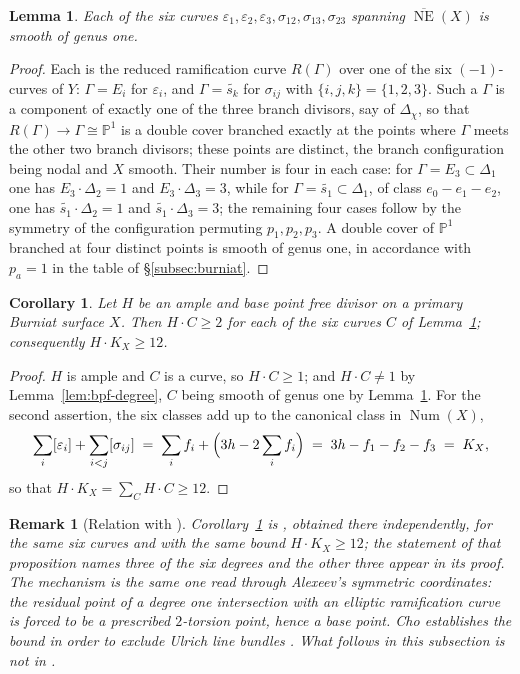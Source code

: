 \documentclass[10pt,a4paper]{amsart}
\newtheorem{lemma}[theorem]{Lemma}
\newtheorem{corollary}[theorem]{Corollary}
\newtheorem{remark}[theorem]{Remark}
\newcommand{\PP}{\mathbb{P}}
\newcommand{\Num}{\operatorname{Num}}
\newcommand{\NE}{\overline{\operatorname{NE}}}
\begin{document}
\begin{lemma}\label{lem:six-elliptic}
Each of the six curves $\varepsilon_1,\varepsilon_2,\varepsilon_3,\sigma_{12},\sigma_{13},\sigma_{23}$ spanning $\NE(X)$ is smooth of genus one.
\end{lemma}

\begin{proof}
Each is the reduced ramification curve $R(\Gamma)$ over one of the six $(-1)$-curves of $Y$: $\Gamma=E_i$ for $\varepsilon_i$, and $\Gamma=\widetilde{s_k}$ for $\sigma_{ij}$ with $\{i,j,k\}=\{1,2,3\}$. Such a $\Gamma$ is a component of exactly one of the three branch divisors, say of $\Delta_\chi$, so that $R(\Gamma)\to\Gamma\cong\PP^1$ is a double cover branched exactly at the points where $\Gamma$ meets the other two branch divisors; these points are distinct, the branch configuration being nodal and $X$ smooth. Their number is four in each case: for $\Gamma=E_3\subset\Delta_1$ one has $E_3\cdot\Delta_2=1$ and $E_3\cdot\Delta_3=3$, while for $\Gamma=\widetilde{s_1}\subset\Delta_1$, of class $e_0-e_1-e_2$, one has $\widetilde{s_1}\cdot\Delta_2=1$ and $\widetilde{s_1}\cdot\Delta_3=3$; the remaining four cases follow by the symmetry of the configuration permuting $p_1,p_2,p_3$. A double cover of $\PP^1$ branched at four distinct points is smooth of genus one, in accordance with $p_a=1$ in the table of \S\ref{subsec:burniat}.
\end{proof}

\begin{corollary}\label{cor:degreetwo}
Let $H$ be an ample and base point free divisor on a primary Burniat surface $X$. Then $H\cdot C\ge2$ for each of the six curves $C$ of Lemma~\ref{lem:six-elliptic}; consequently $H\cdot K_X\ge12$.
\end{corollary}

\begin{proof}
$H$ is ample and $C$ is a curve, so $H\cdot C\ge1$; and $H\cdot C\neq1$ by Lemma~\ref{lem:bpf-degree}, $C$ being smooth of genus one by Lemma~\ref{lem:six-elliptic}. For the second assertion, the six classes add up to the canonical class in $\Num(X)$,
\[
\sum_{i}[\varepsilon_i]+\sum_{i<j}[\sigma_{ij}]
\;=\;\sum_i f_i+\Bigl(3h-2\sum_i f_i\Bigr)
\;=\;3h-f_1-f_2-f_3\;=\;K_X ,
\]
so that $H\cdot K_X=\sum_C H\cdot C\ge12$.
\end{proof}

\begin{remark}[Relation with \cite{Cho26}]\label{rem:cho-degreetwo}
Corollary~\ref{cor:degreetwo} is \cite[Prop.~5.4 and its proof]{Cho26}, obtained there independently, for the same six curves and with the same bound $H\cdot K_X\ge12$; the statement of that proposition names three of the six degrees and the other three appear in its proof. The mechanism is the same one read through Alexeev's symmetric coordinates: the residual point of a degree one intersection with an elliptic ramification curve is forced to be a prescribed $2$-torsion point, hence a base point. Cho establishes the bound in order to exclude Ulrich \emph{line} bundles \cite[Thm.~5.5]{Cho26}. What follows in this subsection is not in \cite{Cho26}.
\end{remark}
\end{document}
